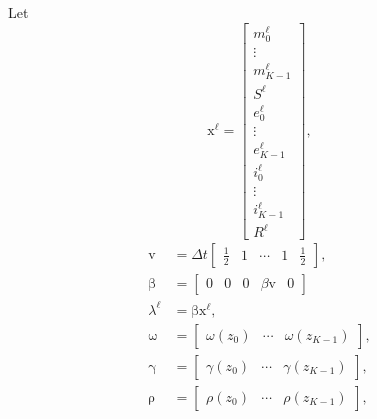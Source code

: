 \documentclass{jpmarticle}
\renewcommand{\vec}[1]{\boldsymbol{\mathrm{#1}}}
\begin{document}
Let
\begin{equation}
  \vec{x}^{\ell} =
  \begin{bmatrix}
    m_0^{\ell} \\ \vdots \\ m_{K - 1}^{\ell} \\
    S^{\ell} \\
    e_0^{\ell} \\ \vdots \\ e_{K - 1}^{\ell} \\
    i_0^{\ell} \\ \vdots \\ i_{K - 1}^{\ell} \\
    R^{\ell}
  \end{bmatrix},
\end{equation}
\begin{equation}
  \begin{split}
    \vec{v} &=
    \Delta t
    \begin{bmatrix}
      \frac{1}{2} & 1 & \cdots & 1 & \frac{1}{2}
    \end{bmatrix},
    \\
    \vec{\beta} &=
    \begin{bmatrix}
      \vec{0} & 0 & \vec{0} & \beta \vec{v} & 0
    \end{bmatrix}
    \\
    \lambda^{\ell} &=
    \vec{\beta} \vec{x}^{\ell},
    \\
    \vec{\omega} &=
    \begin{bmatrix}
      \omega(z_0) & \cdots & \omega(z_{K - 1})
    \end{bmatrix},
    \\
    \vec{\gamma} &=
    \begin{bmatrix}
      \gamma(z_0) & \cdots & \gamma(z_{K - 1})
    \end{bmatrix},
    \\
    \vec{\rho} &=
    \begin{bmatrix}
      \rho(z_0) & \cdots & \rho(z_{K - 1})
    \end{bmatrix},
  \end{split}
\end{equation}
\end{document}
